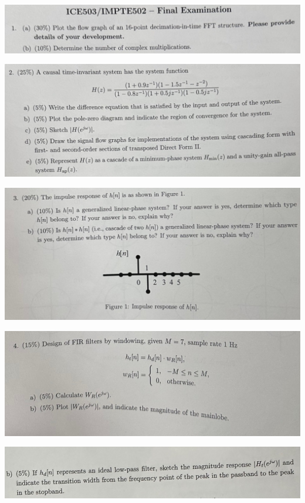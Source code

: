 \documentclass[a4paper]{article}
\begin{document}
	\begin{center}
		\includegraphics[width=1.25\linewidth]{screenshot007}
	\end{center}
	\newpage
	
	\begin{center}
		\includegraphics[width=1.25\linewidth]{screenshot008}
	\end{center}
	\newpage
	
	\begin{center}
		\includegraphics[width=1.25\linewidth]{screenshot009}
	\end{center}
	\newpage
	
	
	\begin{center}
		\includegraphics[width=1.25\linewidth]{screenshot010}
	\end{center}
	\begin{center}
		\includegraphics[width=1.25\linewidth]{screenshot011}
	\end{center}
	\newpage
	
\end{document}
